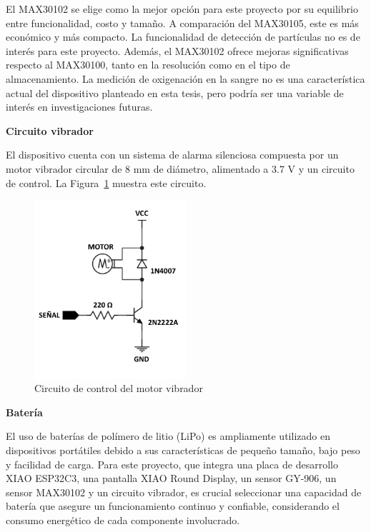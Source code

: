 \documentclass[
  letterpaper,
  DIV=11,
  numbers=noendperiod]{scrreport}
\begin{document}
El MAX30102 se elige como la mejor opción para este proyecto por su
equilibrio entre funcionalidad, costo y tamaño. A comparación del
MAX30105, este es más económico y más compacto. La funcionalidad de
detección de partículas no es de interés para este proyecto. Además, el
MAX30102 ofrece mejoras significativas respecto al MAX30100, tanto en la
resolución como en el tipo de almacenamiento. La medición de oxigenación
en la sangre no es una característica actual del dispositivo planteado
en esta tesis, pero podría ser una variable de interés en
investigaciones futuras.

\textbf{Circuito vibrador}

El dispositivo cuenta con un sistema de alarma silenciosa compuesta por
un motor vibrador circular de 8 mm de diámetro, alimentado a 3.7 V y un
circuito de control. La Figura~\ref{fig-circuito_motor} muestra este
circuito.

\begin{figure}

{\centering \includegraphics[width=0.5\textwidth,height=\textheight]{Capitulos/../Imagenes/Circuito_motor.png}

}

\caption{\label{fig-circuito_motor}Circuito de control del motor
vibrador}

\end{figure}

\textbf{Batería}

El uso de baterías de polímero de litio (LiPo) es ampliamente utilizado
en dispositivos portátiles debido a sus características de pequeño
tamaño, bajo peso y facilidad de carga. Para este proyecto, que integra
una placa de desarrollo XIAO ESP32C3, una pantalla XIAO Round Display,
un sensor GY-906, un sensor MAX30102 y un circuito vibrador, es crucial
seleccionar una capacidad de batería que asegure un funcionamiento
continuo y confiable, considerando el consumo energético de cada
componente involucrado.
\end{document}
